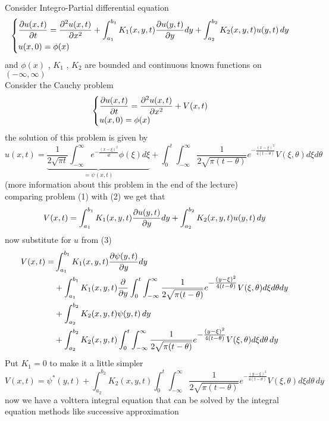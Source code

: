 \documentclass[]{article}
\begin{document}
\begin{example}
    Consider Integro-Partial differential equation
    \begin{equation}
        \begin{cases}
                \displaystyle \pdv{u(x,t)}{t}=\pdv[2]{u(x,t)}{x} + \int_{a_1}^{b_1} K_1(x,y,t) \pdv{u(y,t)}{y} dy + \int_{a_2}^{b_2}K_2(x,y,t)u(y,t) \, dy
                \\
                u(x,0)=\phi(x)
        \end{cases}
    \end{equation}
    and $\phi(x)$ , $K_1$ , $K_2$ are bounded and continuous known functions on $(-\infty,\infty)$
    \\
    Consider the Cauchy problem 
    \begin{equation}
        \begin{cases}
                \displaystyle \pdv{u(x,t)}{t}=\pdv[2]{u(x,t)}{x} + V(x,t)
                \\
                u(x,0)=\phi(x)
        \end{cases}
    \end{equation}
    the solution of this problem is given by 
    \begin{equation}
        u(x,t) = \underbrace{\frac{1}{2\sqrt{\pi t}}\int_{-\infty}^{\infty}e^{\textstyle -\frac{{(x-\xi)}^2}{4t}} \phi(\xi)d\xi}_{= \psi(x,t)} 
    + \int_{0}^{t} \int_{-\infty}^{\infty}\frac{1}{2\sqrt{\pi (t-\theta)}} e^{\textstyle -\frac{{(x-\xi)}^2}{4(t-\theta)}} V(\xi,\theta)d\xi d\theta
    \end{equation}
    (more information about this problem in the end of the lecture)
    \\
    comparing problem (1) with (2) we get that  
    \[
        V(x,t) = \int_{a_1}^{b_1} K_1(x,y,t) \pdv{u(y,t)}{y} dy + \int_{a_2}^{b_2}K_2(x,y,t)u(y,t) \, dy
    \]
    now substitute for $u$ from (3)
    \begin{align*}
        V(x,t) =& \int_{a_1}^{b_1} K_1(x,y,t) \pdv{\psi(y,t)}{y} dy 
                \\
                &+ \int_{a_1}^{b_1} K_1(x,y,t) \pdv{}{y} \int_{0}^{t} \int_{-\infty}^{\infty}\frac{1}{2\sqrt{\pi (t-\theta)}} e^{\textstyle -\frac{{(y-\xi)}^2}{4(t-\theta)}} V(\xi,\theta)d\xi d\theta dy 
                \\
                &+ \int_{a_2}^{b_2}K_2(x,y,t) \psi(y,t) \, dy
                \\
                &+ \int_{a_2}^{b_2}K_2(x,y,t) \int_{0}^{t} \int_{-\infty}^{\infty}\frac{1}{2\sqrt{\pi (t-\theta)}} e^{\textstyle -\frac{{(y-\xi)}^2}{4(t-\theta)}} V(\xi,\theta)d\xi d\theta \, dy
    \end{align*}
    Put $K_1 = 0 $ to make it a little simpler
    \[
        V(x,t) = \psi^*(y,t) + \int_{a_2}^{b_2}K_2(x,y,t) \int_{0}^{t} \int_{-\infty}^{\infty}\frac{1}{2\sqrt{\pi (t-\theta)}} e^{\textstyle -\frac{{(y-\xi)}^2}{4(t-\theta)}} V(\xi,\theta)d\xi d\theta \, dy    
    \]
    now we have a volttera integral equation that can be solved by the integral equation methods like successive approximation
\end{example}
\end{document}
